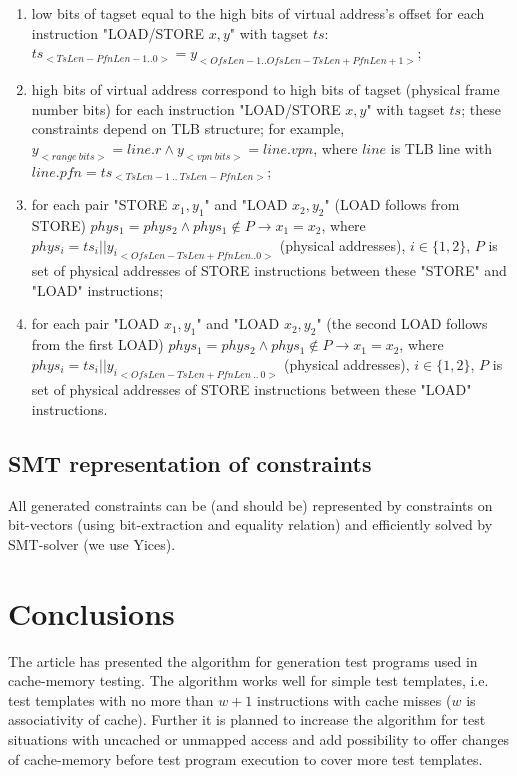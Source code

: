 \documentclass[times, 10pt,twocolumn]{article}
\begin{document}
\begin{enumerate}

\item low bits of tagset equal to the high bits of virtual address's offset for each
instruction "LOAD/STORE $x, y$" with tagset $ts$:
$ts_{<TsLen-PfnLen-1..0>} = y_{<OfsLen-1..OfsLen-TsLen+PfnLen+1>}$;

\item high bits of virtual address correspond to high bits of tagset
(physical frame number bits) for each instruction "LOAD/STORE $x,
y$" with tagset $ts$; these constraints depend on TLB structure; for
example, $y_{<range~bits>} = line.r \wedge y_{<vpn~bits>} =
line.vpn$, where $line$ is TLB line with $line.pfn =
ts_{<TsLen-1~..~TsLen-PfnLen>}$;

\item for each pair "STORE $x_1, y_1$"
and "LOAD $x_2, y_2$" (LOAD follows from STORE) $phys_1 = phys_2
\wedge phys_1 \notin P \rightarrow x_1 = x_2$, where $phys_i = ts_i
|| {y_i}_{<OfsLen-TsLen+PfnLen..0>}$ (physical addresses), $i \in
\{1, 2\}$, $P$ is set of physical addresses of STORE instructions
between these "STORE" and "LOAD" instructions;

\item for each pair "LOAD
$x_1, y_1$" and "LOAD $x_2, y_2$" (the second LOAD follows from the
first LOAD) $phys_1 = phys_2 \wedge phys_1 \notin P \rightarrow x_1
= x_2$, where $phys_i = ts_i || {y_i}_{<OfsLen-TsLen+PfnLen~..~0>}$
(physical addresses), $i \in \{1, 2\}$, $P$ is set of physical
addresses of STORE instructions between these "LOAD" instructions.
\end{enumerate}

\subsection{SMT representation of constraints}
All generated constraints can be (and should be) represented by constraints on bit-vectors (using bit-extraction and equality relation) and efficiently solved by SMT-solver (we use Yices).

\section{Conclusions}
The article has presented the algorithm for generation test programs used in cache-memory testing. The algorithm works well for simple test templates, i.e. test templates with no more than $w+1$ instructions with cache misses ($w$ is associativity of cache). Further it is planned to increase the algorithm for test situations with uncached or unmapped access and add possibility to offer changes of cache-memory before test program execution to cover more test templates.




\end{document}
